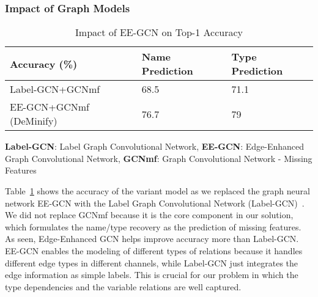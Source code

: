 \subsubsection{Impact of Graph Models}
\label{sec:models}



\begin{table}[!ht]
  \centering
  \tabcolsep 2.5pt
    \begin{tabular}{|l|l|l|}
    \hline
        Accuracy (\%) & Name Prediction & Type Prediction\\ \hline
        Label-GCN+GCNmf & 68.5 & 71.1 \\ \hline
        EE-GCN+GCNmf (DeMinify) & 76.7 & 79 \\ \hline
    \end{tabular}
    {\bf Label-GCN}: Label Graph Convolutional Network, {\bf EE-GCN}: Edge-Enhanced Graph Convolutional Network, {\bf GCNmf}: Graph Convolutional Network - Missing Features
    \caption{Impact of EE-GCN on Top-1 Accuracy}
    \vspace{-10pt}
    \label{tab:sensi-graph}
\end{table}

Table~\ref{tab:sensi-graph} shows the accuracy of the variant model
as we replaced the graph neural network EE-GCN with the Label Graph
Convolutional Network (Label-GCN)~\cite{label-gcn}. We did not replace
GCNmf because it is the core component in our solution, which
formulates the name/type recovery as the prediction of missing
features. As seen, Edge-Enhanced GCN helps improve accuracy more than
Label-GCN. EE-GCN enables the modeling of different types of relations
because it handles different edge types in different channels, while
Label-GCN just integrates the edge information as simple labels.
This is crucial for our problem in which the type dependencies
and the variable relations are well captured.


